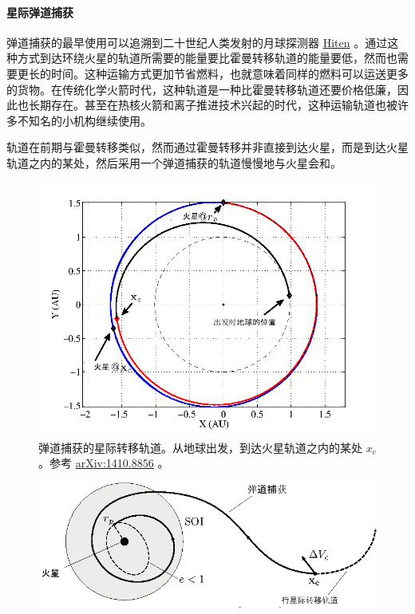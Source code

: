 \documentclass[letterpaper,10pt]{sphinxmanual}
\begin{document}
\paragraph{星际弹道捕获}
\label{tech:id7}
弹道捕获的最早使用可以追溯到二十世纪人类发射的月球探测器 \href{https://en.wikipedia.org/wiki/Low-energy\_transfer\#History}{Hiten} 。通过这种方式到达环绕火星的轨道所需要的能量要比霍曼转移轨道的能量要低，然而也需要更长的时间。这种运输方式更加节省燃料，也就意味着同样的燃料可以运送更多的货物。在传统化学火箭时代，这种轨道是一种比霍曼转移轨道还要价格低廉，因此也长期存在。甚至在热核火箭和离子推进技术兴起的时代，这种运输轨道也被许多不知名的小机构继续使用。

轨道在前期与霍曼转移类似，然而通过霍曼转移并非直接到达火星，而是到达火星轨道之内的某处，然后采用一个弹道捕获的轨道慢慢地与火星会和。
\begin{figure}[htbp]
\centering
\capstart

\includegraphics{BallisticCaptureTransferStructure0.png}
\caption{弹道捕获的星际转移轨道。从地球出发，到达火星轨道之内的某处 $x_c$ 。参考 \href{http://arxiv.org/abs/1410.8856}{arXiv:1410.8856} 。}\end{figure}
\begin{figure}[htbp]
\centering

\includegraphics{BallisticCaptureTransferStructure.png}
\end{figure}
\end{document}
